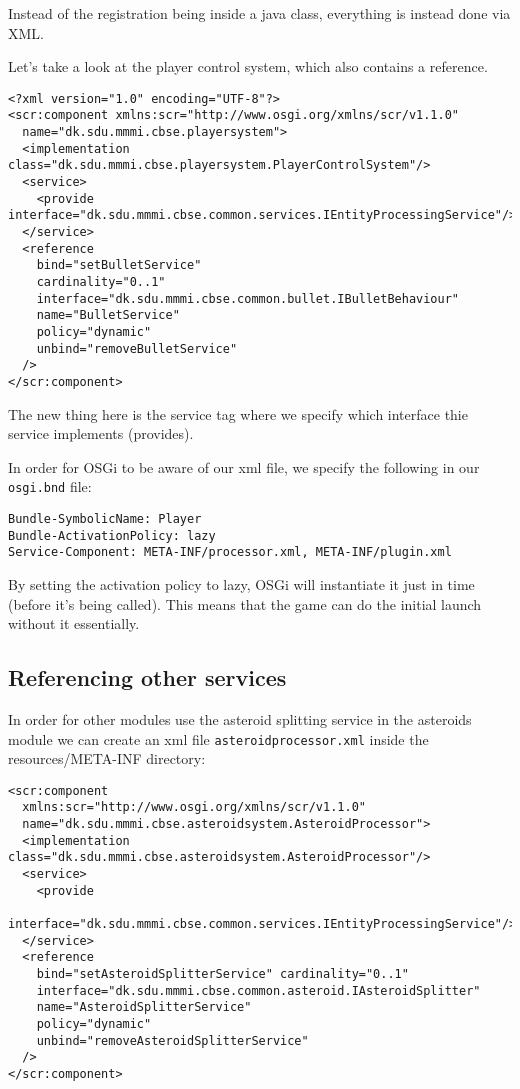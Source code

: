 Instead of the registration being inside a java class, everything is instead
done via XML.

Let's take a look at the player control system, which also contains a reference.

\begin{verbatim}
<?xml version="1.0" encoding="UTF-8"?>
<scr:component xmlns:scr="http://www.osgi.org/xmlns/scr/v1.1.0"
  name="dk.sdu.mmmi.cbse.playersystem">
  <implementation class="dk.sdu.mmmi.cbse.playersystem.PlayerControlSystem"/>
  <service>
    <provide interface="dk.sdu.mmmi.cbse.common.services.IEntityProcessingService"/>
  </service>
  <reference
    bind="setBulletService"
    cardinality="0..1"
    interface="dk.sdu.mmmi.cbse.common.bullet.IBulletBehaviour"
    name="BulletService"
    policy="dynamic"
    unbind="removeBulletService"
  />
</scr:component>
\end{verbatim}

The new thing here is the service tag where we specify which interface thie
service implements (provides).

In order for OSGi to be aware of our xml file, we specify the following in our
\texttt{osgi.bnd} file:

\begin{verbatim}
Bundle-SymbolicName: Player
Bundle-ActivationPolicy: lazy
Service-Component: META-INF/processor.xml, META-INF/plugin.xml
\end{verbatim}

By setting the activation policy to lazy, OSGi will instantiate it just in time
(before it's being called). This means that the game can do the
initial launch without it essentially.

\subsection{Referencing other services}
In order for other modules use the asteroid splitting service in the asteroids module we can
create an xml file \texttt{asteroidprocessor.xml} inside the resources/META-INF directory:

\begin{verbatim}
<scr:component
  xmlns:scr="http://www.osgi.org/xmlns/scr/v1.1.0"
  name="dk.sdu.mmmi.cbse.asteroidsystem.AsteroidProcessor">
  <implementation class="dk.sdu.mmmi.cbse.asteroidsystem.AsteroidProcessor"/>
  <service>
    <provide 
    interface="dk.sdu.mmmi.cbse.common.services.IEntityProcessingService"/>
  </service>
  <reference 
    bind="setAsteroidSplitterService" cardinality="0..1"
    interface="dk.sdu.mmmi.cbse.common.asteroid.IAsteroidSplitter"
    name="AsteroidSplitterService"
    policy="dynamic"
    unbind="removeAsteroidSplitterService"
  />
</scr:component>
\end{verbatim}

